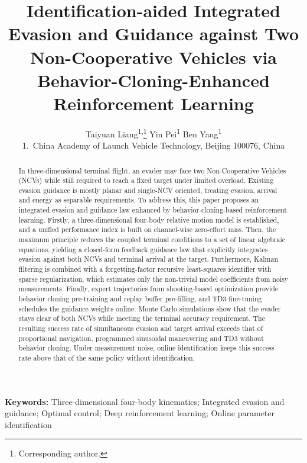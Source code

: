 

\title{Identification-aided Integrated Evasion and Guidance against Two Non-Cooperative Vehicles via Behavior-Cloning-Enhanced Reinforcement Learning}
\author{%
Taiyuan Liang\textsuperscript{1,}\thanks{Corresponding author.}\qquad
Yin Pei\textsuperscript{1}\qquad
Ben Yang\textsuperscript{1}\\[0.6em]
{\normalsize 1.~China Academy of Launch Vehicle Technology, Beijing 100076, China}%
}
\date{}


\maketitle

\begin{abstract}
In three-dimensional terminal flight, an evader may face two Non-Cooperative Vehicles (NCVs) while still required to reach a fixed target under limited overload. Existing evasion guidance is mostly planar and single-NCV oriented, treating evasion, arrival and energy as separable requirements. To address this, this paper proposes an integrated evasion and guidance law enhanced by behavior-cloning-based reinforcement learning. Firstly, a three-dimensional four-body relative motion model is established, and a unified performance index is built on channel-wise zero-effort miss. Then, the maximum principle reduces the coupled terminal conditions to a set of linear algebraic equations, yielding a closed-form feedback guidance law that explicitly integrates evasion against both NCVs and terminal arrival at the target. Furthermore, Kalman filtering is combined with a forgetting-factor recursive least-squares identifier with sparse regularization, which estimates only the non-trivial model coefficients from noisy measurements. Finally, expert trajectories from shooting-based optimization provide behavior cloning pre-training and replay buffer pre-filling, and TD3 fine-tuning schedules the guidance weights online. Monte Carlo simulations show that the evader stays clear of both NCVs while meeting the terminal accuracy requirement. The resulting success rate of simultaneous evasion and target arrival exceeds that of proportional navigation, programmed sinusoidal maneuvering and TD3 without behavior cloning. Under measurement noise, online identification keeps this success rate above that of the same policy without identification.
\end{abstract}

\noindent\textbf{Keywords:} Three-dimensional four-body kinematics; Integrated evasion and guidance; Optimal control; Deep reinforcement learning; Online parameter identification

